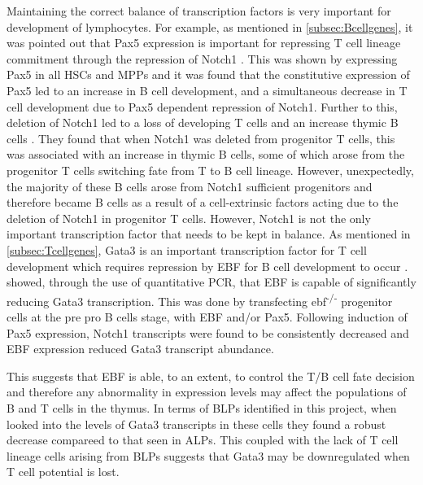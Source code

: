 Maintaining the correct balance of transcription factors is very important for development of lymphocytes. 
For example, as mentioned in \cref{subsec:Bcellgenes}, it was pointed out that Pax5 expression is important for repressing T cell lineage commitment through the repression of Notch1 \citep{Souabni2002}.
This was shown by expressing Pax5 in all HSCs and MPPs and it was found that the constitutive expression of Pax5 led to an increase in B cell development, and a simultaneous decrease in T cell development due to Pax5 dependent repression of Notch1.
Further to this, deletion of Notch1 led to a loss of developing T cells and an increase thymic B cells \citep{Feyerabend2009}.
They found that when Notch1 was deleted from progenitor T cells, this was associated with an increase in thymic B cells, some of which arose from the progenitor T cells switching fate from T to B cell lineage.
However, unexpectedly, the majority of these B cells arose from Notch1 sufficient progenitors and therefore became B cells as a result of a cell-extrinsic factors acting due to the deletion of Notch1 in progenitor T cells.
However, Notch1 is not the only important transcription factor that needs to be kept in balance.
As mentioned in \cref{subsec:Tcellgenes}, Gata3 is an important transcription factor for T cell development which requires repression by EBF for B cell development to occur \citep{Banerjee2013}.
\citet{Banerjee2013} showed, through the use of quantitative PCR, that EBF is capable of significantly reducing Gata3 transcription.
This was done by transfecting ebf\textsuperscript{-/-} progenitor cells at the pre pro B cells stage, with EBF and/or Pax5.
Following induction of Pax5 expression, Notch1 transcripts were found to be consistently decreased and EBF expression reduced Gata3 transcript abundance.

This suggests that EBF is able, to an extent, to control the T/B cell fate decision and therefore any abnormality in expression levels may affect the populations of B and T cells in the thymus.
In terms of BLPs identified in this project, when \citet{Banerjee2013} looked into the levels of Gata3 transcripts in these cells they found a robust decrease compareed to that seen in ALPs.
This coupled with the lack of T cell lineage cells arising from BLPs suggests that Gata3 may be downregulated when T cell potential is lost.

